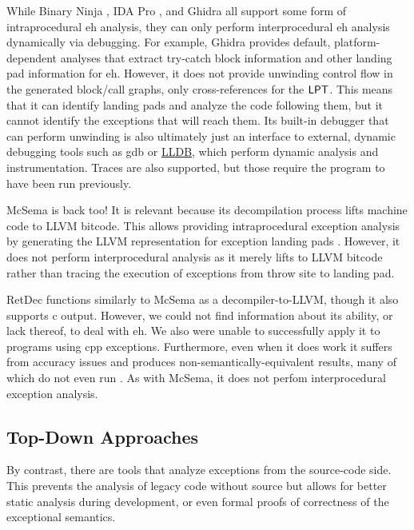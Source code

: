 While Binary Ninja \autocite{binary-ninja}, IDA Pro \autocite{ida}, and Ghidra \autocite{ghidra} all support some form of intraprocedural \ac{eh} analysis, they can only perform interprocedural \ac{eh} analysis dynamically via debugging.
For example, Ghidra provides default, platform-dependent analyses that extract try-catch block information and other landing pad information for \ac{eh}.
However, it does not provide unwinding control flow in the generated block/call graphs, only cross-references for the $\operatorname{\mathsf{LPT}}$.
This means that it can identify landing pads and analyze the code following them, but it cannot identify the exceptions that will reach them.
Its built-in debugger that can perform unwinding is also ultimately just an interface to external, dynamic debugging tools such as \ac{gdb} or \href{https://lldb.llvm.org/}{LLDB},
which perform dynamic analysis and instrumentation. Traces are also supported,
but those require the program to have been run previously.

McSema \autocite{mcsema} is back too! It is relevant because its decompilation process lifts machine code to LLVM bitcode.
This allows providing intraprocedural exception analysis by generating the LLVM representation for exception landing pads \autocite{mcsema-exceptions}.
However, it does not perform interprocedural analysis as it merely lifts to LLVM bitcode rather than tracing the execution of exceptions from throw site to landing pad.

RetDec \autocite{retdec} functions similarly to McSema as a decompiler-to-LLVM, though it also supports \gls{c} output.
However, we could not find information about its ability, or lack thereof, to deal with \ac{eh}. We also were unable to successfully apply it to programs using \gls{cpp} exceptions.
Furthermore, even when it does work it suffers from accuracy issues and produces non-semantically-equivalent results, many of which do not even run \autocite{foudree2019regsym}.
As with McSema, it does not perfom interprocedural exception analysis.

\subsection{Top-Down Approaches}
By contrast, there are tools that analyze exceptions from the source-code side.
This prevents the analysis of legacy code without source but allows for better static analysis during development, or even formal proofs of correctness of the exceptional semantics.

